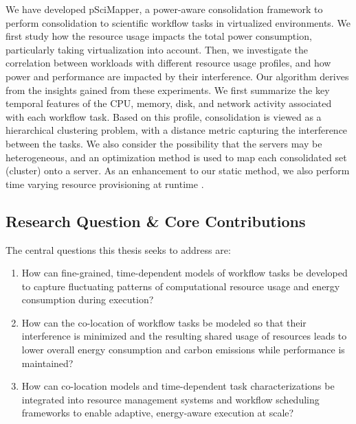 We have developed pSciMapper, a power-aware consolidation framework to perform consolidation to scientific workflow tasks in virtualized environments. We first study how the resource usage impacts the total power consumption, particularly taking virtualization into account. Then, we investigate the correlation between workloads with different resource usage profiles, and how power and performance are impacted by their interference. Our algorithm derives from the insights gained from these experiments. We first summarize the key temporal features of the CPU, memory, disk, and network activity associated with each workflow task. Based on this profile, consolidation is viewed as a hierarchical clustering problem, with a distance metric capturing the interference between the tasks. We also consider the possibility that the servers may be heterogeneous, and an optimization method is used to map each consolidated set (cluster) onto a server. As an enhancement to our static method, we also perform time varying resource provisioning at runtime \cite{5644899}.

\subsection{Research Question \& Core Contributions}
\label{subse:research_question_core_contributions}

The central questions this thesis seeks to address are:

\begin{enumerate}[label=RQ\arabic*]
    \item How can fine-grained, time-dependent models of workflow tasks be developed to capture fluctuating patterns of computational resource usage and energy consumption during execution?
    \item How can the co-location of workflow tasks be modeled so that their interference is minimized and the resulting shared usage of resources leads to lower overall energy consumption and carbon emissions while performance is maintained?
    \item How can co-location models and time-dependent task characterizations be integrated into resource management systems and workflow scheduling frameworks to enable adaptive, energy-aware execution at scale?
\end{enumerate}

